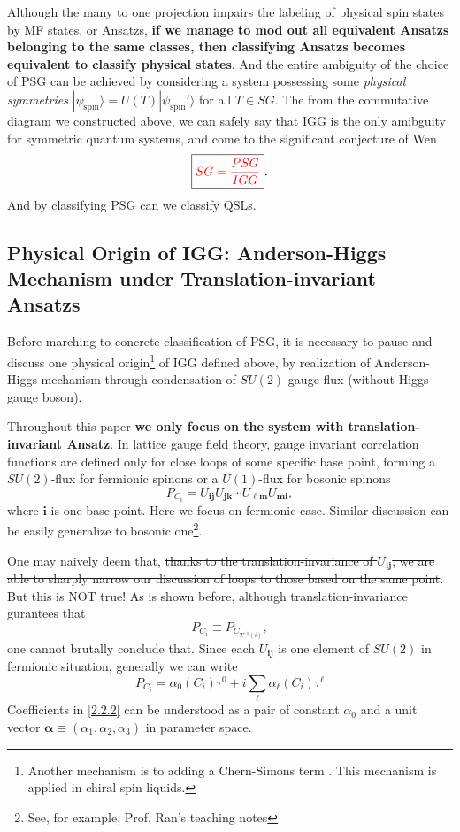 \documentclass[10pt,nofootinbib]{revtex4}
\begin{document}
	\indent Although the many to one projection impairs the labeling of physical spin states by MF states, or Ansatzs, \textbf{if we manage to mod out all equivalent Ansatzs belonging to the same classes, then classifying Ansatzs becomes equivalent to classify physical states}. And the entire ambiguity of the choice of PSG can be achieved by considering a system possessing some \emph{physical symmetries} $|\psi_{\text{spin}}\rangle=U(T)|\psi_{\text{spin}}'\rangle$ for all $T\in SG$. The from the commutative diagram we constructed above, we can safely say that IGG is the only amibguity for symmetric quantum systems, and come to the significant conjecture of Wen \cite{wen2001quantum,Wen-QFT}
	\begin{equation}\label{2.1.3}
		\boxed{\color{red}SG=\dfrac{PSG}{IGG}}.
	\end{equation}
	And by classifying PSG can we classify QSLs.

	\subsection{Physical Origin of IGG: Anderson-Higgs Mechanism under Translation-invariant Ansatzs}
	Before marching to concrete classification of PSG, it is necessary to pause and discuss one physical origin\footnote{Another mechanism is to adding a Chern-Simons term \cite{Wen-QFT}. This mechanism is applied in chiral spin liquids.} of IGG defined above, by realization of Anderson-Higgs mechanism through condensation of $SU(2)$ gauge flux (without Higgs gauge boson).\par
	Throughout this paper \textbf{we only focus on the system with translation-invariant Ansatz}. In lattice gauge field theory, gauge invariant correlation functions are defined only for close loops \cite{kogut1979introduction} of some specific base point, forming a $SU(2)$-flux for fermionic spinons or a $U(1)$-flux for bosonic spinons
	\begin{equation}\label{2.2.1}
		P_{C_i}=U_{\bm{ij}}U_{\bm{jk}}\cdots U_{\bm{\ell m}}U_{\bm{m i}},
	\end{equation}
	where  $\bm{i}$ is one base point. Here we focus on fermionic case. Similar discussion can be easily generalize to bosonic one\footnote{See, for example, Prof. Ran's teaching notes}.\par
	One may naively deem that, {\color{red}\sout{thanks to the translation-invariance of $U_{\bm{ij}}$, we are able to sharply narrow our discussion of loops to those based on the same point}}. {\color{red}But this is NOT true!} As is shown before, although translation-invariance gurantees that
	\begin{equation*}
		P_{C_i}\equiv P_{C_{T^{-1}(i)}},
	\end{equation*}
	one cannot brutally conclude that.
	Since each $U_{\bm{ij}}$ is one element of $SU(2)$ in fermionic situation, generally we can write
	\begin{equation}\label{2.2.2}
		P_{C_i}=\alpha_0(C_i)\tau^0+i\sum_\ell\alpha_\ell(C_i)\tau^\ell
	\end{equation}
	Coefficients in \eqref{2.2.2} can be understood as a pair of constant $\alpha_0$ and a unit vector $\bm{\alpha}\equiv(\alpha_1,\alpha_2,\alpha_3)$ in parameter space.
\end{document}
